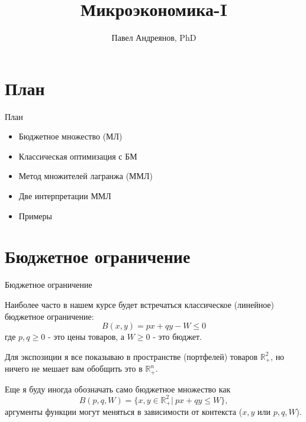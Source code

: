 \documentclass{beamer}
\title{
Микроэкономика-I
}
\author{
Павел Андреянов, PhD
}
\begin{document}
\maketitle

\section{План}

\begin{frame}{План}

\begin{itemize}
  \item Бюджетное множество (МЛ)
  \item Классическая оптимизация с БМ
  \item Метод множителей лагранжа (ММЛ)
  \item Две интерпретации ММЛ
  \item Примеры
\end{itemize}

\end{frame}


\section{Бюджетное ограничение}

\begin{frame}{Бюджетное ограничение}

Наиболее часто в нашем курсе будет встречаться классическое (линейное) \alert{бюджетное ограничение}:
$$ B(x,y) = p x + q y - W \leqslant 0$$
где $p, q \geqslant 0$ - это цены товаров, а $W \geqslant 0$ - это бюджет. 

Для экспозиции я все показываю в пространстве (портфелей) товаров $\mathbb{R}^2_+$, но ничего не мешает вам обобщить это в $\mathbb{R}^n_+$. 

Еще я буду иногда обозначать само \alert{бюджетное множество} как $$B(p,q,W)=\{x,y \in \mathbb{R}^2_{+}| \ px + qy \leqslant W\},$$ аргументы функции могут меняться в зависимости от контекста ($x,y$ или $p,q,W$).

\end{frame}
\end{document}
